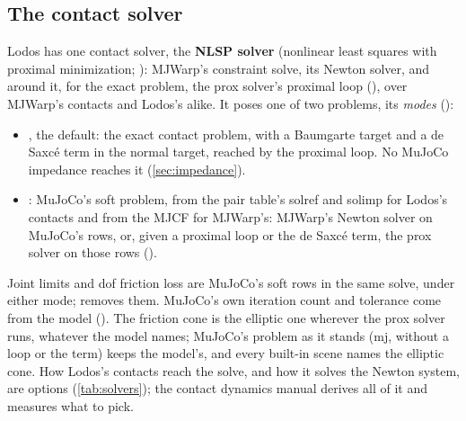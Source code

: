 \subsection{The contact solver}\label{sec:solvers}

Lodos has one contact solver, the \textbf{NLSP solver} (nonlinear least squares with proximal minimization; ): MJWarp's constraint solve, its Newton solver, and around it, for the exact problem, the prox solver's proximal loop (), over MJWarp's contacts and Lodos's alike. It poses one of two problems, its \emph{modes} ():

\begin{itemize}
\item {}, the default: the exact contact problem, with a Baumgarte target and a de Saxc\'e term in the normal target, reached by the proximal loop. No MuJoCo impedance reaches it (\cref{sec:impedance}).
\item {}: MuJoCo's soft problem, from the pair table's solref and solimp for Lodos's contacts and from the MJCF for MJWarp's: MJWarp's Newton solver on MuJoCo's rows, or, given a proximal loop or the de Saxc\'e term, the prox solver on those rows ().
\end{itemize}

Joint limits and dof friction loss are MuJoCo's soft rows in the same solve, under either mode;  removes them. MuJoCo's own iteration count and tolerance come from the model (). The friction cone is the elliptic one wherever the prox solver runs, whatever the model names; MuJoCo's problem as it stands (mj, without a loop or the term) keeps the model's, and every built-in scene names the elliptic cone. How Lodos's contacts reach the solve, and how it solves the Newton system, are options (\cref{tab:solvers}); the contact dynamics manual derives all of it and measures what to pick.

